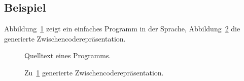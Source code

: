 \documentclass[twoside,a4paper,fleqn,12pt]{book}
\begin{document}

\subsection{Beispiel}

Abbildung~\ref{fig:ir_sample_src} zeigt ein einfaches Programm in der Sprache, Abbildung~\ref{fig:ir_sample_gen} die generierte Zwischencoderepräsentation.

\begin{figure}[hp]
   \centering
  
  \caption{Quelltext eines Programms.}
  \label{fig:ir_sample_src}
\end{figure}
\begin{figure}[hp]
   \centering
  
  \caption{Zu~\ref{fig:ir_sample_src} generierte Zwischencoderepräsentation.}
  \label{fig:ir_sample_gen}
\end{figure}
\end{document}
